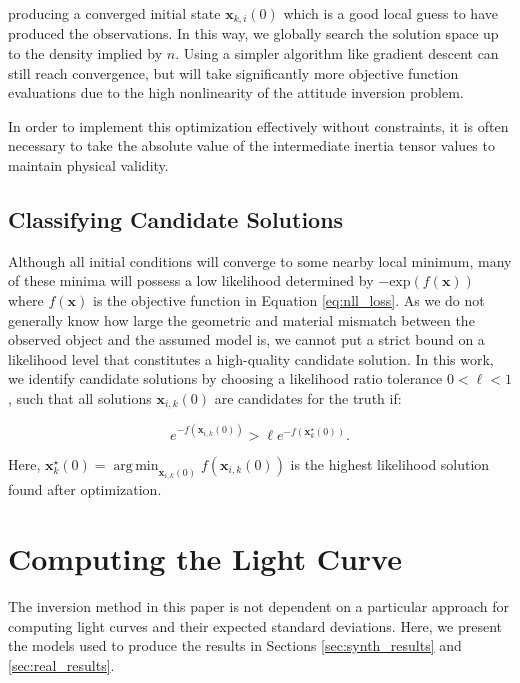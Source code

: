 \documentclass[a4paper,twocolumn]{spaceDebrisC} %
\newcommand{\vctr}[1]{\bm{#1}}
\DeclareMathOperator*{\argmin}{arg\,min}
\begin{document}
\noindent
producing a converged initial state $\vctr{x}_{k,i}(0)$ which is a good local guess to have produced the observations. In this way, we globally search the solution space up to the density implied by $n$. Using a simpler algorithm like gradient descent can still reach convergence, but will take significantly more objective function evaluations due to the high nonlinearity of the attitude inversion problem.

In order to implement this optimization effectively without constraints, it is often necessary to take the absolute value of the intermediate inertia tensor values to maintain physical validity. 

\subsection{Classifying Candidate Solutions} \label{sec:candidate_sols}

Although all initial conditions will converge to some nearby local minimum, many of these minima will possess a low likelihood determined by $-\mathrm{exp}(f(\vctr{x}))$ where $f(\vctr{x})$ is the objective function in Equation \ref{eq:nll_loss}. As we do not generally know how large the geometric and material mismatch between the observed object and the assumed model is, we cannot put a strict bound on a likelihood level that constitutes a high-quality candidate solution. In this work, we identify candidate solutions by choosing a likelihood ratio tolerance $0 < \ell < 1$, such that all solutions $\vctr{x}_{i,k}(0)$ are candidates for the truth if:

\begin{equation} \label{eq:ell_selection_criteria}
 e^{-f\left(\vctr{x}_{i,k}(0)\right)} > \ell e^{-f\left(\vctr{x}^\star_{k}(0)\right)}.
\end{equation}

Here, $\vctr{x}^\star_{k}(0) = \argmin_{\vctr{x}_{i,k}(0)} f\left(\vctr{x}_{i,k}(0)\right) $ is the highest likelihood solution found after optimization.

\section{Computing the Light Curve}

The inversion method in this paper is not dependent on a particular approach for computing light curves and their expected standard deviations. Here, we present the models used to produce the results in Sections \ref{sec:synth_results} and \ref{sec:real_results}.
\end{document}
